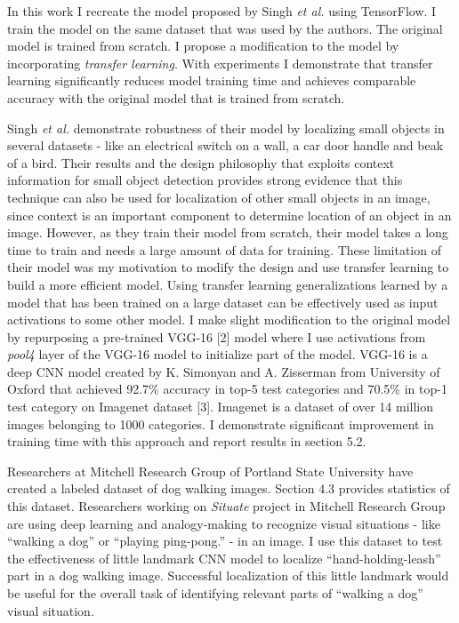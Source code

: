 \documentclass [11pt,letterpaper ,twoside ,openany ]{report}
\begin{document}
    In this work I recreate the model proposed by Singh \textit {et al.} using TensorFlow\textsuperscript{\textregistered}. I train the model on the same dataset that was used by the authors. The original model is trained from scratch. I propose a modification to the model by incorporating \textit {transfer learning}. With experiments I demonstrate that transfer learning  significantly reduces model training time and achieves comparable accuracy with the original model that is trained from scratch.  

    Singh \textit {et al.} demonstrate robustness of their model by localizing small objects in several datasets - like an electrical switch on a wall, a car door handle and beak of a bird. Their results and the design philosophy that exploits context information for small object detection provides strong evidence that this technique can also be used for localization of other small objects in an image, since context is an important component to determine location of an object in an image. However, as they train their model from scratch, their model takes a long time to train and needs a large amount of data for training.  These limitation of their model was my motivation to modify the design and use transfer learning to build a more efficient model. Using transfer learning generalizations learned by a model that has been trained on a large dataset can be effectively used as input activations to some other model. I make slight modification to the original model by repurposing a pre-trained VGG-16 [2] model where I use activations from \textit{pool4} layer of the VGG-16 model to initialize part of the model. VGG-16 is a deep CNN model created by K. Simonyan and A. Zisserman from University of Oxford that achieved 92.7\% accuracy in top-5 test categories and 70.5\% in top-1 test category on Imagenet dataset [3]. Imagenet is a dataset of over 14 million images belonging to 1000 categories. I demonstrate significant improvement in training time with this approach and report results in section 5.2.

    Researchers at Mitchell Research Group of Portland State University have created a labeled dataset of dog walking images. Section 4.3 provides statistics of this dataset. Researchers working on \textit {Situate} project in Mitchell Research Group are using deep learning and analogy-making to recognize visual situations - like ``walking a dog'' or ``playing ping-pong.'' - in an image. I use this dataset to test the effectiveness of little landmark CNN model to localize ``hand-holding-leash'' part in a dog walking image. Successful localization of this little landmark would be useful for the overall task of identifying relevant parts of ``walking a dog'' visual situation.
\end{document}
